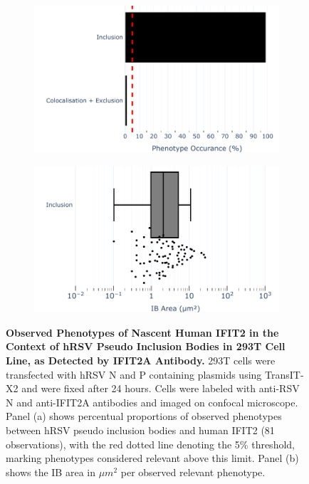\begin{figure}
    \begin{subfigure}{0.495\textwidth}
        \caption{}
        \includegraphics[width=1\linewidth]{08. Chapter 3/Figs/03. pIB/03. IFIT2/02. IFIT2A/01. bar_i2a_293t.pdf}
    \end{subfigure}
    \begin{subfigure}{0.495\textwidth}
        \caption{}
        \includegraphics[width=1\linewidth]{08. Chapter 3/Figs/03. pIB/03. IFIT2/02. IFIT2A/02. box_i2a_293t.pdf}
    \end{subfigure}
    \caption[Observed Phenotypes of Nascent Human IFIT2 in the Context of hRSV Pseudo Inclusion Bodies in 293T Cell Line, as Detected by IFIT2A Antibody.]{\textbf{Observed Phenotypes of Nascent Human IFIT2 in the Context of hRSV Pseudo Inclusion Bodies in 293T Cell Line, as Detected by IFIT2A Antibody.} 293T cells were transfected with hRSV N and P containing plasmids using TransIT-X2 and were fixed after 24 hours. Cells were labeled with anti-RSV N and anti-IFIT2A antibodies and imaged on confocal microscope. Panel (a) shows percentual proportions of observed phenotypes between hRSV pseudo inclusion bodies and human IFIT2 (81 observations), with the red dotted line denoting the 5\% threshold, marking phenotypes considered relevant above this limit. Panel (b) shows the IB area in \(\mu m^2\) per observed relevant phenotype.}
    \label{fig:Observed Phenotypes of Nascent Human IFIT2 in the Context of hRSV Pseudo Inclusion Bodies in 293T Cell Line, as Detected by IFIT2A Antibody}
\end{figure}

